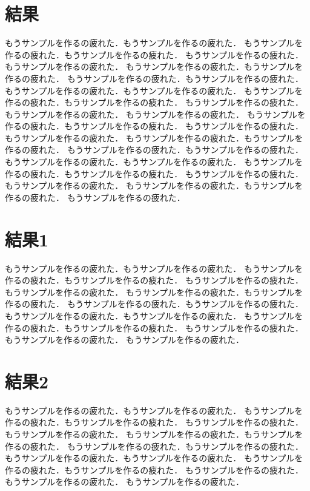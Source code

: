 %
%

\section{結果}
もうサンプルを作るの疲れた．もうサンプルを作るの疲れた．
もうサンプルを作るの疲れた．もうサンプルを作るの疲れた．
もうサンプルを作るの疲れた．もうサンプルを作るの疲れた．
もうサンプルを作るの疲れた．もうサンプルを作るの疲れた．
もうサンプルを作るの疲れた．もうサンプルを作るの疲れた．
もうサンプルを作るの疲れた．もうサンプルを作るの疲れた．
もうサンプルを作るの疲れた．もうサンプルを作るの疲れた．
もうサンプルを作るの疲れた．もうサンプルを作るの疲れた．
もうサンプルを作るの疲れた．
もうサンプルを作るの疲れた．もうサンプルを作るの疲れた．
もうサンプルを作るの疲れた．もうサンプルを作るの疲れた．
もうサンプルを作るの疲れた．もうサンプルを作るの疲れた．
もうサンプルを作るの疲れた．もうサンプルを作るの疲れた．
もうサンプルを作るの疲れた．もうサンプルを作るの疲れた．
もうサンプルを作るの疲れた．もうサンプルを作るの疲れた．
もうサンプルを作るの疲れた．もうサンプルを作るの疲れた．
もうサンプルを作るの疲れた．もうサンプルを作るの疲れた．
もうサンプルを作るの疲れた．

\section{結果1}
もうサンプルを作るの疲れた．もうサンプルを作るの疲れた．
もうサンプルを作るの疲れた．もうサンプルを作るの疲れた．
もうサンプルを作るの疲れた．もうサンプルを作るの疲れた．
もうサンプルを作るの疲れた．もうサンプルを作るの疲れた．
もうサンプルを作るの疲れた．もうサンプルを作るの疲れた．
もうサンプルを作るの疲れた．もうサンプルを作るの疲れた．
もうサンプルを作るの疲れた．もうサンプルを作るの疲れた．
もうサンプルを作るの疲れた．もうサンプルを作るの疲れた．
もうサンプルを作るの疲れた．

\section{結果2}
もうサンプルを作るの疲れた．もうサンプルを作るの疲れた．
もうサンプルを作るの疲れた．もうサンプルを作るの疲れた．
もうサンプルを作るの疲れた．もうサンプルを作るの疲れた．
もうサンプルを作るの疲れた．もうサンプルを作るの疲れた．
もうサンプルを作るの疲れた．もうサンプルを作るの疲れた．
もうサンプルを作るの疲れた．もうサンプルを作るの疲れた．
もうサンプルを作るの疲れた．もうサンプルを作るの疲れた．
もうサンプルを作るの疲れた．もうサンプルを作るの疲れた．
もうサンプルを作るの疲れた．

